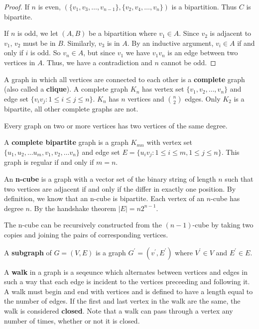 \documentclass[12pt]{article}
\begin{document}
\begin{proof}
If $n$ is even, $(\{v_1, v_3, \dots, v_{n-1}\}, \{v_2, v_4, \dots, v_n\})$ is a bipartition. Thus $C$ is bipartite.

If $n$ is odd, we let $(A,B)$ be a bipartition where $v_1 \in A$. Since $v_2$ is adjacent to $v_1$, $v_2$ must be in $B$. Similarly, $v_3$ is in $A$. By an inductive argument, $v_i \in A$ if and only if $i$ is odd. So $v_n \in A$, but since $v_1$ we have $v_1 v_n$ is an edge between two vertices in $A$. Thus, we have a contradiction and $n$ cannot be odd.
\end{proof}

A graph in which all vertices are connected to each other is a {\bf complete} graph (also called a {\bf clique}). A complete graph $K_n$ has vertex set $\{v_1, v_2, \dots, v_n\}$ and edge set $\{v_i v_j : 1 \leq i \leq j \leq n\}$. $K_n$ has $n$ vertices and ${n \choose 2}$ edges. Only $K_2$ is a bipartite, all other complete graphs are not.

\begin{lemma}
Every graph on two or more vertices has two vertices of the same degree.
\end{lemma}

A {\bf complete bipartite} graph is a graph $K_{mn}$ with vertex set $\{u_1, u_2, \dots u_m, v_1, v_2, \dots v_n\}$ and edge set $E = \{ u_i v_j : 1 \leq i \leq m, 1 \leq j \leq n \}$. This graph is regular if and only if $m = n$.

An {\bf n-cube} is a graph with a vector set of the binary string of length $n$ such that two vertices are adjacent if and only if the differ in exactly one position. By definition, we know that an n-cube is bipartite. Each vertex of an $n$-cube has degree $n$. By the handshake theorem $|E| = n2^{n-1}$.

The n-cube can be recursively constructed from the $(n-1)$-cube by taking two copies and joining the pairs of corresponding vertices.

A {\bf subgraph} of $G = (V,E)$ is a graph $G^\prime = (v^\prime, E^\prime)$ where $V^\prime \in V$ and $E^\prime \in E$.

A {\bf walk} in a graph is a seqeunce which alternates between vertices and edges in such a way that each edge is incident to the vertices preceeding and following it. A walk must begin and end with vertices and is defined to have a length equal to the number of edges. If the first and last vertex in the walk are the same, the walk is considered {\bf closed}. Note that a walk can pass through a vertex any number of times, whether or not it is closed.
\end{document}
